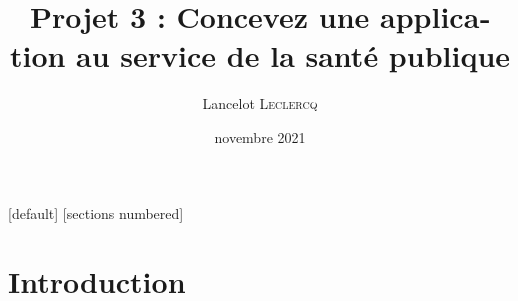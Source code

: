 
\usepackage{fontspec}
	\setmainfont{TeX Gyre Heros}
\usepackage{unicode-math}
\usepackage{lualatex-math}
\usepackage{polyglossia}
\setdefaultlanguage[frenchpart=false]{french}
\usepackage{microtype}
\usepackage[locale = FR,
            separate-uncertainty,
            multi-part-units = single,
            range-units = single]{siunitx}
	\DeclareSIUnit{}
\usepackage{amsmath}
\usepackage{amsfonts}
\usepackage{amssymb}
\usepackage{array}
\usepackage{graphicx}
\graphicspath{{./Figures/}}
\usepackage{booktabs}
\usepackage{tabularx}
\usepackage{multirow}
\usepackage{multicol}
\usepackage{tikz}
\usetikzlibrary{mindmap}
\usetikzlibrary{overlay-beamer-styles}
\usepackage{subcaption}
\usepackage[]{animate}
\usepackage{float}
\usepackage{csquotes}

[default]
[sections numbered]

\title[Concevez une application au service de la santé publique]{Projet 3 : Concevez une application au service de la santé publique}
\author[Lancelot \textsc{Leclercq}]{Lancelot \textsc{Leclercq}} 
\institute[]{}
\date[]{\small{novembre 2021}}



\begin{frame}[plain]
  \titlepage
\end{frame}

\section{Introduction}

